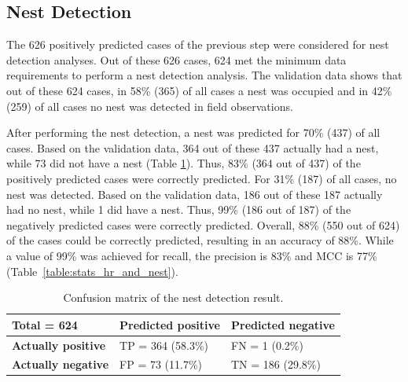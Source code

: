 \subsection{Nest Detection}
The 626 positively predicted cases of the previous step were considered for nest detection analyses. Out of these 626 cases, 624 met the minimum data requirements to perform a nest detection analysis. The validation data shows that out of these 624 cases, in 58\% (365) of all cases a nest was occupied and in 42\% (259) of all cases no nest was detected in field observations.

After performing the nest detection, a nest was predicted for 70\% (437) of all cases. Based on the validation data, 364 out of these 437 actually had a nest, while 73 did not have a nest (Table \ref{table:conf_matrix_nest}). Thus, 83\% (364 out of 437) of the positively predicted cases were correctly predicted. For 31\% (187) of all cases, no nest was detected. Based on the validation data, 186 out of these 187 actually had no nest, while 1 did have a nest. Thus, 99\% (186 out of 187) of the negatively predicted cases were correctly predicted.  Overall, 88\% (550 out of 624) of the cases could be correctly predicted, resulting in an accuracy of 88\%. While a value of 99\% was achieved for recall, the precision is 83\% and MCC is 77\% (Table~\ref{table:stats_hr_and_nest}).

\begin{table}[H]
\begin{center}
\caption[Confusion matrix of the nest detection result]{Confusion matrix of the nest detection result.}
\label{table:conf_matrix_nest}
\begin{tabularx}{0.5\textwidth} {
    | >{\centering\arraybackslash}X 
    | >{\centering\arraybackslash}X 
    | >{\centering\arraybackslash}X | }
\hline
Total \break = 624 & \textbf{Predicted \break positive} & \textbf{Predicted \break negative} \\
\hline
\textbf{Actually \break positive} &
\cellcolor[HTML]{CCFFCC} TP = 364 \break (58.3\%) & %
\cellcolor[HTML]{FFCCCC} FN = 1 \break (0.2\%) \\  %
\hline
\textbf{Actually \break negative} &
\cellcolor[HTML]{FFCCCC} FP = 73 \break (11.7\%) &  %
\cellcolor[HTML]{CCFFCC} TN = 186 \break (29.8\%) \\ %
\hline
\end{tabularx}
\end{center}
\end{table}

